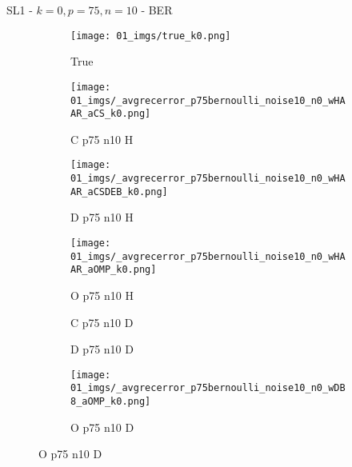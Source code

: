 \begin{frame}{SL1 - $k=0,p=75,n=10$ - BER}{}
\begin{figure}
\begin{subfigure}{0.13\textwidth}
\texttt{[image: 01\_imgs/true\_k0.png]}
\caption*{\tiny True}
\end{subfigure}
\begin{subfigure}{0.13\textwidth}
\texttt{[image: 01\_imgs/\_avgrecerror\_p75bernoulli\_noise10\_n0\_wHAAR\_aCS\_k0.png]}
\caption*{\tiny C p75 n10 H}
\end{subfigure}
\begin{subfigure}{0.13\textwidth}
\texttt{[image: 01\_imgs/\_avgrecerror\_p75bernoulli\_noise10\_n0\_wHAAR\_aCSDEB\_k0.png]}
\caption*{\tiny D p75 n10 H}
\end{subfigure}
\begin{subfigure}{0.13\textwidth}
\texttt{[image: 01\_imgs/\_avgrecerror\_p75bernoulli\_noise10\_n0\_wHAAR\_aOMP\_k0.png]}
\caption*{\tiny O p75 n10 H}
\end{subfigure}
\begin{subfigure}{0.13\textwidth}
\caption*{\tiny C p75 n10 D}
\end{subfigure}
\begin{subfigure}{0.13\textwidth}
\caption*{\tiny D p75 n10 D}
\end{subfigure}
\begin{subfigure}{0.13\textwidth}
\texttt{[image: 01\_imgs/\_avgrecerror\_p75bernoulli\_noise10\_n0\_wDB8\_aOMP\_k0.png]}
\caption*{\tiny O p75 n10 D}
\end{subfigure}

\vspace{5pt}


\end{figure}
\end{frame}
